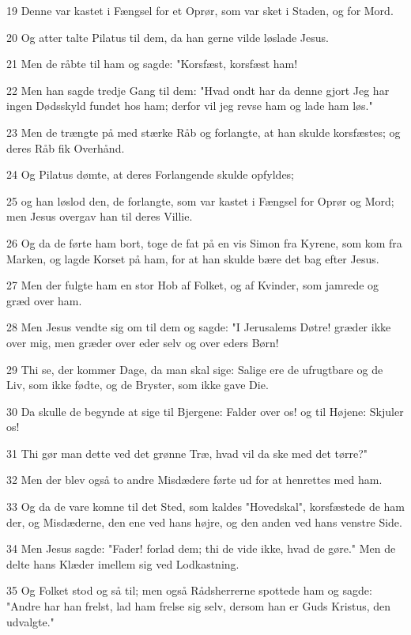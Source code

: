 \par 19 Denne var kastet i Fængsel for et Oprør, som var sket i Staden, og for Mord.
\par 20 Og atter talte Pilatus til dem, da han gerne vilde løslade Jesus.
\par 21 Men de råbte til ham og sagde: "Korsfæst, korsfæst ham!
\par 22 Men han sagde tredje Gang til dem: "Hvad ondt har da denne gjort Jeg har ingen Dødsskyld fundet hos ham; derfor vil jeg revse ham og lade ham løs."
\par 23 Men de trængte på med stærke Råb og forlangte, at han skulde korsfæstes; og deres Råb fik Overhånd.
\par 24 Og Pilatus dømte, at deres Forlangende skulde opfyldes;
\par 25 og han løslod den, de forlangte, som var kastet i Fængsel for Oprør og Mord; men Jesus overgav han til deres Villie.
\par 26 Og da de førte ham bort, toge de fat på en vis Simon fra Kyrene, som kom fra Marken, og lagde Korset på ham, for at han skulde bære det bag efter Jesus.
\par 27 Men der fulgte ham en stor Hob af Folket, og af Kvinder, som jamrede og græd over ham.
\par 28 Men Jesus vendte sig om til dem og sagde: "I Jerusalems Døtre! græder ikke over mig, men græder over eder selv og over eders Børn!
\par 29 Thi se, der kommer Dage, da man skal sige: Salige ere de ufrugtbare og de Liv, som ikke fødte, og de Bryster, som ikke gave Die.
\par 30 Da skulle de begynde at sige til Bjergene: Falder over os! og til Højene: Skjuler os!
\par 31 Thi gør man dette ved det grønne Træ, hvad vil da ske med det tørre?"
\par 32 Men der blev også to andre Misdædere førte ud for at henrettes med ham.
\par 33 Og da de vare komne til det Sted, som kaldes "Hovedskal", korsfæstede de ham der, og Misdæderne, den ene ved hans højre, og den anden ved hans venstre Side.
\par 34 Men Jesus sagde: "Fader! forlad dem; thi de vide ikke, hvad de gøre." Men de delte hans Klæder imellem sig ved Lodkastning.
\par 35 Og Folket stod og så til; men også Rådsherrerne spottede ham og sagde: "Andre har han frelst, lad ham frelse sig selv, dersom han er Guds Kristus, den udvalgte."

